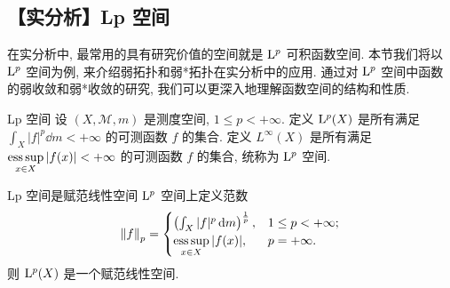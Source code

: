     \subsection{【实分析】Lp 空间}

        \begin{intrormk}
            [Dedicatia]
            在实分析中, 最常用的具有研究价值的空间就是 \(\Lp\) 可积函数空间. 本节我们将以 \(\Lp\) 空间为例, 来介绍弱拓扑和弱*拓扑在实分析中的应用. 通过对 \(\Lp\) 空间中函数的弱收敛和弱*收敛的研究, 我们可以更深入地理解函数空间的结构和性质.
        \end{intrormk}

        \begin{ins}
            [lp]
            {Lp 空间}
            设 \((X, \mathcal{M}, m)\) 是测度空间, \(1\leq p < +\infty\). 定义 \(\Lp(X)\) 是所有满足 \(\int_X |f|^p \dd{m} < +\infty\) 的可测函数 \(f\) 的集合. 定义 \(L^\infty(X)\) 是所有满足 \(\operatorname*{\mathrm{ess\,sup}}\limits_{x\in X} |f(x)| < +\infty\) 的可测函数 \(f\) 的集合, 统称为 \(\Lp\) 空间.
        \end{ins}

        \begin{varthm}
            {Lp 空间是赋范线性空间}
            \(\Lp\) 空间上定义范数
            \[\norm{f}_p = \begin{cases}
                \left(\int_X |f|^p \dd{m}\right)^{\frac{1}{p}}, & 1\leq p < +\infty;\\
                \operatorname*{\mathrm{ess\,sup}}\limits_{x\in X} |f(x)|, & p = +\infty.
            \end{cases}\]
            则 \(\Lp(X)\) 是一个赋范线性空间.
        \end{varthm}

